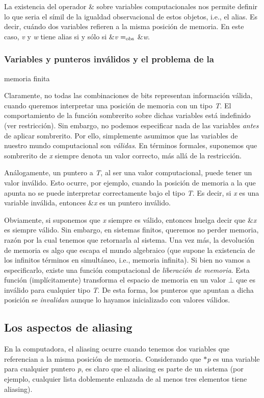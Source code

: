 La existencia del operador \& sobre variables computacionales nos permite definir lo que seria el símil de la igualdad observacional de estos objetos, i.\+e., el alias. Es decir, cuándo dos variables refieren a la misma posición de memoria. En este caso, {\itshape v} y {\itshape w} tiene alias si y sólo si \&{\itshape v} $=_{\rm obs}$ \&{\itshape w}.\hypertarget{Aliasing_sec-invalido}{}\subsubsection{Variables y punteros inválidos y el problema de la}\label{Aliasing_sec-invalido}
memoria finita

Claramente, no todas las combinaciones de bits representan información válida, cuando queremos interpretar una posición de memoria con un tipo {\itshape T}. El comportamiento de la función sombrerito sobre dichas variables está indefinido (ver restricción). Sin embargo, no podemos especificar nada de las variables {\itshape antes} de aplicar sombrerito. Por ello, simplemente asumimos que las variables de nuestro mundo computacional son {\itshape válidas}. En términos formales, suponemos que sombrerito de {\itshape x} siempre denota un valor correcto, más allá de la restricción.

Análogamente, un puntero a {\itshape T}, al ser una valor computacional, puede tener un valor inválido. Esto ocurre, por ejemplo, cuando la posición de memoria a la que apunta no se puede interpretar correctamente bajo el tipo {\itshape T}. Es decir, si {\itshape x} es una variable inválida, entonces \&{\itshape x} es un puntero inválido.

Obviamente, si suponemos que {\itshape x} siempre es válido, entonces huelga decir que \&{\itshape x} es siempre válido. Sin embargo, en sistemas finitos, queremos no perder memoria, razón por la cual tenemos que retornarla al sistema. Una vez más, la devolución de memoria es algo que escapa el mundo algebraico (que supone la existencia de los infinitos términos en simultáneo, i.\+e., memoria infinita). Si bien no vamos a especificarlo, existe una función computacional de {\itshape liberación de memoria}. Esta función (implícitamente) transforma el espacio de memoria en un valor $\bot$ que es inválido para cualquier tipo {\itshape T}. De esta forma, los punteros que apuntan a dicha posición se {\itshape invalidan} aunque lo hayamos inicializado con valores válidos.\hypertarget{Aliasing_sec-aliasing}{}\subsection{Los aspectos de aliasing}\label{Aliasing_sec-aliasing}
En la computadora, el aliasing ocurre cuando tenemos dos variables que referencian a la misma posición de memoria. Considerando que $\ast${\itshape p} es una variable para cualquier puntero {\itshape p}, es claro que el aliasing es parte de un sistema (por ejemplo, cualquier lista doblemente enlazada de al menos tres elementos tiene aliasing).

